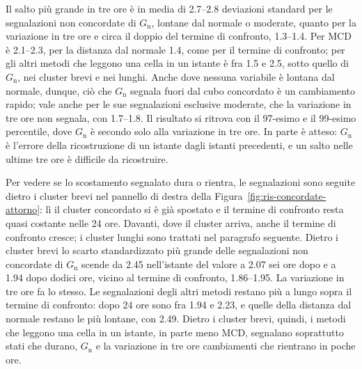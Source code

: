 Il salto più grande in tre ore è in media di 2.7--2.8 deviazioni standard per le segnalazioni non concordate di $G_{\mathrm{n}}$, lontane dal normale o moderate, quanto per la variazione in tre ore e circa il doppio del termine di confronto, 1.3--1.4. Per MCD è 2.1--2.3, per la distanza dal normale 1.4, come per il termine di confronto; per gli altri metodi che leggono una cella in un istante è fra 1.5 e 2.5, sotto quello di $G_{\mathrm{n}}$, nei cluster brevi e nei lunghi. Anche dove nessuna variabile è lontana dal normale, dunque, ciò che $G_{\mathrm{n}}$ segnala fuori dal cubo concordato è un cambiamento rapido; vale anche per le sue segnalazioni esclusive moderate, che la variazione in tre ore non segnala, con 1.7--1.8. Il risultato si ritrova con il 97-esimo e il 99-esimo percentile, dove $G_{\mathrm{n}}$ è secondo solo alla variazione in tre ore. In parte è atteso: $G_{\mathrm{n}}$ è l'errore della ricostruzione di un istante dagli istanti precedenti, e un salto nelle ultime tre ore è difficile da ricostruire.

Per vedere se lo scostamento segnalato dura o rientra, le segnalazioni sono seguite dietro i cluster brevi nel pannello di destra della Figura~\ref{fig:ris-concordate-attorno}: lì il cluster concordato si è già spostato e il termine di confronto resta quasi costante nelle 24 ore. Davanti, dove il cluster arriva, anche il termine di confronto cresce; i cluster lunghi sono trattati nel paragrafo seguente. Dietro i cluster brevi lo scarto standardizzato più grande delle segnalazioni non concordate di $G_{\mathrm{n}}$ scende da 2.45 nell'istante del valore a 2.07 sei ore dopo e a 1.94 dopo dodici ore, vicino al termine di confronto, 1.86--1.95. La variazione in tre ore fa lo stesso. Le segnalazioni degli altri metodi restano più a lungo sopra il termine di confronto: dopo 24 ore sono fra 1.94 e 2.23, e quelle della distanza dal normale restano le più lontane, con 2.49. Dietro i cluster brevi, quindi, i metodi che leggono una cella in un istante, in parte meno MCD, segnalano soprattutto stati che durano, $G_{\mathrm{n}}$ e la variazione in tre ore cambiamenti che rientrano in poche ore.

